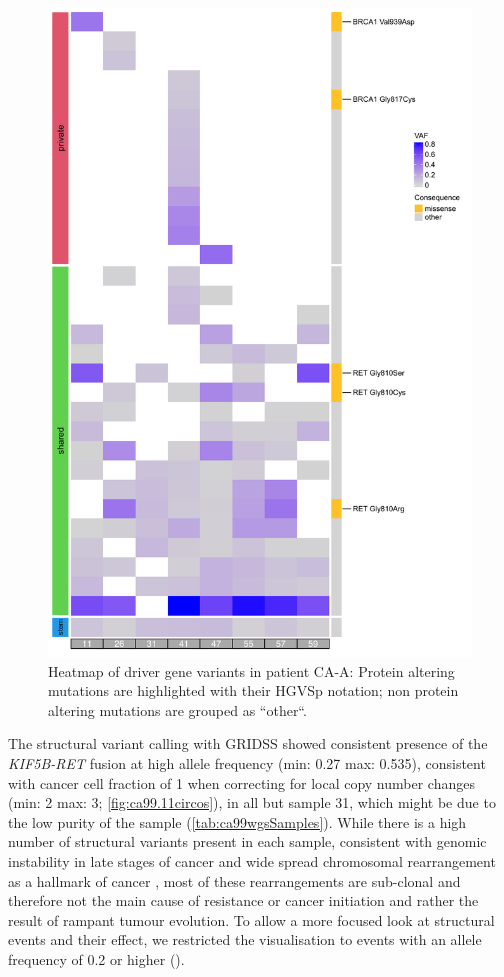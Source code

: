 \begin{figure}[ht]
\centering
\includegraphics[width=.99\linewidth]{Figures/CASCADE/CA99/CA99varHeatmap.pdf}
\caption[Heatmap of driver gene variants in patient CA-A]{Heatmap of driver gene variants in patient CA-A: Protein altering mutations are highlighted with their HGVSp notation; non protein altering mutations are grouped as ``other``.} \label{fig:ca99heatmap}
\end{figure}



The structural variant calling with GRIDSS showed consistent presence of the \textit{KIF5B-RET} fusion at high allele frequency (min: 0.27 max: 0.535), consistent with cancer cell fraction of 1 when correcting for local copy number changes  (min: 2 max: 3; \autoref{fig:ca99.11circos}), in all but sample 31, which might be due to the low purity of the sample (\autoref{tab:ca99wgsSamples}). While there is a high number of structural variants present in each sample, consistent with genomic instability in late stages of cancer \cite{Gerstung2020} and wide spread chromosomal rearrangement as a hallmark of cancer \cite{Hanahan2022}, most of these rearrangements are sub-clonal and therefore not the main cause of resistance or cancer initiation and rather the result of rampant tumour evolution. To allow a more focused look at structural events and their effect, we restricted the visualisation to events with an allele frequency of 0.2 or higher ().


